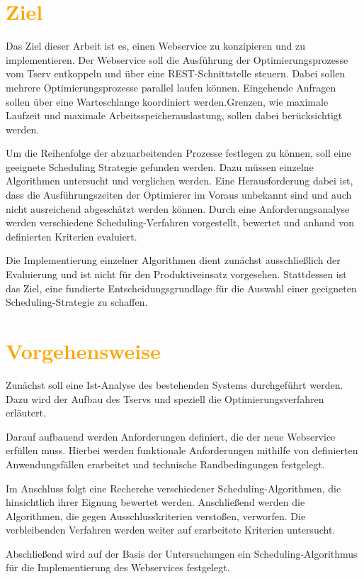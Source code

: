 \section{\textcolor{orange}{Ziel}}

Das Ziel dieser Arbeit ist es, einen Webservice zu konzipieren und zu implementieren. Der Webservice soll die Ausführung der Optimierungsprozesse vom Tserv entkoppeln und über eine REST-Schnittstelle steuern. Dabei sollen mehrere Optimierungsprozesse parallel laufen können. Eingehende Anfragen sollen über eine Warteschlange koordiniert werden.Grenzen, wie maximale Laufzeit und maximale Arbeitsspeicherauslastung, sollen dabei berücksichtigt werden.

Um die Reihenfolge der abzuarbeitenden Prozesse festlegen zu können, soll eine geeignete Scheduling Strategie gefunden werden. Dazu müssen einzelne Algorithmen untersucht und verglichen werden. Eine Herausforderung dabei ist, dass die Ausführungszeiten der Optimierer im Voraus unbekannt sind und auch nicht ausreichend abgeschätzt werden können. Durch eine Anforderungsanalyse werden verschiedene Scheduling-Verfahren vorgestellt, bewertet und anhand von definierten Kriterien evaluiert.

Die Implementierung einzelner Algorithmen dient zunächst ausschließlich der Evaluierung und ist nicht für den Produktiveinsatz vorgesehen. Stattdessen ist das Ziel, eine fundierte Entscheidungsgrundlage für die Auswahl einer geeigneten Scheduling-Strategie zu schaffen.

\section{\textcolor{orange}{Vorgehensweise}}

Zunächst soll eine Ist-Analyse des bestehenden Systems durchgeführt werden. Dazu wird der Aufbau des Tservs und speziell die Optimierungsverfahren erläutert. 

Darauf aufbauend werden Anforderungen definiert, die der neue Webservice erfüllen muss. Hierbei werden funktionale Anforderungen mithilfe von definierten Anwendungsfällen erarbeitet und technische Randbedingungen festgelegt.

Im Anschluss folgt eine Recherche verschiedener Scheduling-Algorithmen, die hinsichtlich ihrer Eignung bewertet werden. Anschließend werden die Algorithmen, die gegen Ausschlusskriterien verstoßen, verworfen. Die verbleibenden Verfahren werden weiter auf erarbeitete Kriterien untersucht.

Abschließend wird auf der Basis der Untersuchungen ein Scheduling-Algorithmus für die Implementierung des Webservices festgelegt.
